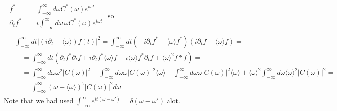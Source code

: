 \documentclass[twoside, 10pt]{amsart}
\begin{document}
\[
\begin{gathered}
  \begin{aligned}
    f^* & = \int_{-\infty}^{\infty} d\omega C^*(\omega) e^{ i \omega t} \\
    \partial_t f^* & = i \int_{-\infty}^{\infty} d\omega \, \omega C^*(\omega) e^{i \omega t} 
  \end{aligned} \text{ so } \\
  \begin{aligned}
    & \int_{-\infty}^{\infty} dt | (i \partial_t - \langle \omega \rangle ) f(t) |^2 = \int_{-\infty}^{\infty} dt ( - i \partial_t f^* - \langle \omega \rangle f^* ) (i \partial_t f - \langle \omega \rangle f ) = \\
    & \quad = \int_{-\infty}^{\infty} dt ( \partial_t f^* \partial_t f + i \partial_t f^* \langle \omega \rangle f - i \langle \omega \rangle f^* \partial_t f + \langle \omega \rangle^2 f* f ) = \\
    & \quad = \int_{-\infty}^{\infty} d\omega \omega^2 |C(\omega)|^2 - \int_{-\infty}^{\infty} d\omega \omega |C(\omega)|^2 \langle \omega \rangle - \int_{-\infty}^{\infty} d\omega \omega |C(\omega)|^2 \langle \omega \rangle + \langle \omega \rangle^2 \int_{-\infty}^{\infty} d\omega \langle \omega \rangle^2 |C(\omega)|^2 = \\
    & \quad = \int_{-\infty}^{\infty} (\omega- \langle \omega \rangle )^2 |C(\omega)|^2 d\omega 
\end{aligned}
\end{gathered}
\]
Note that we had used $\int_{-\infty}^{\infty} e^{it (\omega- \omega') } = \delta(\omega - \omega')$ alot.  
\end{document}
